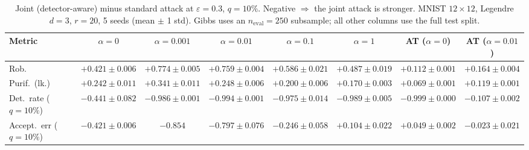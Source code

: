 \begin{table}[htbp]
  \centering
  \begin{tabular}{@{}lccccccc@{}}
    \toprule
    Metric & $\alpha{=}0$ & $\alpha{=}0.001$ & $\alpha{=}0.01$ & $\alpha{=}0.1$ & $\alpha{=}1$ & AT ($\alpha{=}0$) & AT ($\alpha{=}0.01$) \\
    \midrule
    Rob. & $+0.421 \pm 0.006$ & $+0.774 \pm 0.005$ & $+0.759 \pm 0.004$ & $+0.586 \pm 0.021$ & $+0.487 \pm 0.019$ & $+0.112 \pm 0.001$ & $+0.164 \pm 0.004$ \\
    Purif.\ (lk.) & $+0.242 \pm 0.011$ & $+0.341 \pm 0.011$ & $+0.248 \pm 0.006$ & $+0.200 \pm 0.006$ & $+0.170 \pm 0.003$ & $+0.069 \pm 0.001$ & $+0.119 \pm 0.001$ \\
    Det.\ rate ($q{=}10\%$) & $-0.441 \pm 0.082$ & $-0.986 \pm 0.001$ & $-0.994 \pm 0.001$ & $-0.975 \pm 0.014$ & $-0.989 \pm 0.005$ & $-0.999 \pm 0.000$ & $-0.107 \pm 0.002$ \\
    Accept.\ err ($q{=}10\%$) & $-0.421 \pm 0.006$ & $-0.854$ & $-0.797 \pm 0.076$ & $-0.246 \pm 0.058$ & $+0.104 \pm 0.022$ & $+0.049 \pm 0.002$ & $-0.023 \pm 0.021$ \\
    \bottomrule
  \end{tabular}
  \caption{Joint (detector-aware) minus standard attack at $\varepsilon=0.3$, $q{=}10\%$. Negative $\Rightarrow$ the joint attack is stronger. MNIST $12\times12$, Legendre $d{=}3$, $r{=}20$, 5 seeds (mean $\pm$ 1 std). Gibbs uses an $n_{\mathrm{eval}}=250$ subsample; all other columns use the full test split.}
  \label{tab:mnist_r12_joint_r20_eps0.3}
\end{table}
